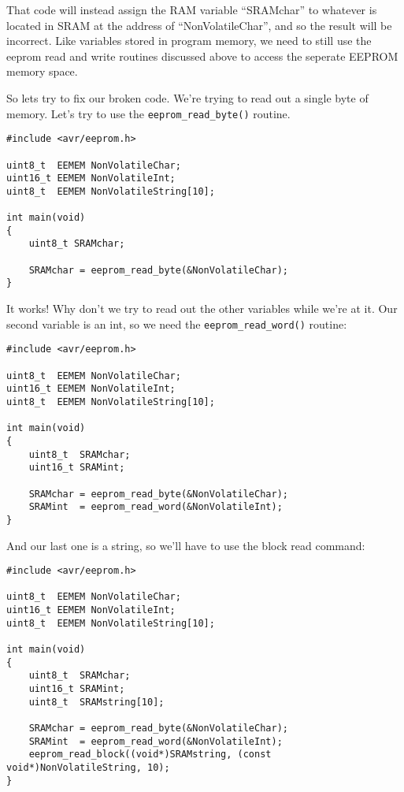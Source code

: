 \documentclass[a4paper,oneside,notitlepage]{book}
\begin{document}
That code will instead assign the RAM variable ``SRAMchar'' to whatever is located in SRAM at the address of ``NonVolatileChar'', and so the result will be incorrect. Like variables stored in program memory, we need to still use the eeprom read and write routines discussed above to access the seperate EEPROM memory space.

So lets try to fix our broken code. We're trying to read out a single byte of memory. Let's try to use the \lstinline{eeprom_read_byte()} routine.

\begin{center}
\begin{lstlisting}
#include <avr/eeprom.h>

uint8_t  EEMEM NonVolatileChar;
uint16_t EEMEM NonVolatileInt;
uint8_t  EEMEM NonVolatileString[10];

int main(void)
{
    uint8_t SRAMchar;

    SRAMchar = eeprom_read_byte(&NonVolatileChar);
}
\end{lstlisting}
\end{center}

It works! Why don't we try to read out the other variables while we're at it. Our second variable is an int, so we need the \lstinline{eeprom_read_word()} routine:

\begin{center}
\begin{lstlisting}
#include <avr/eeprom.h>

uint8_t  EEMEM NonVolatileChar;
uint16_t EEMEM NonVolatileInt;
uint8_t  EEMEM NonVolatileString[10];

int main(void)
{
    uint8_t  SRAMchar;
    uint16_t SRAMint;

    SRAMchar = eeprom_read_byte(&NonVolatileChar);
    SRAMint  = eeprom_read_word(&NonVolatileInt);
}
\end{lstlisting}
\end{center}

And our last one is a string, so we'll have to use the block read command:

\begin{center}
\begin{lstlisting}
#include <avr/eeprom.h>

uint8_t  EEMEM NonVolatileChar;
uint16_t EEMEM NonVolatileInt;
uint8_t  EEMEM NonVolatileString[10];

int main(void)
{
    uint8_t  SRAMchar;
    uint16_t SRAMint;
    uint8_t  SRAMstring[10];

    SRAMchar = eeprom_read_byte(&NonVolatileChar);
    SRAMint  = eeprom_read_word(&NonVolatileInt);
    eeprom_read_block((void*)SRAMstring, (const void*)NonVolatileString, 10);
}
\end{lstlisting}
\end{center}
\end{document}
